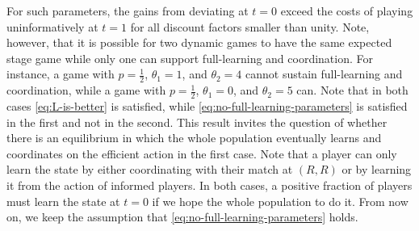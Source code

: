 \documentclass[12pt,letterpaper]{article}
\begin{document}
For such parameters, the gains from deviating at $t=0$ exceed the costs of playing uninformatively at $t=1$ for all discount factors smaller than unity. Note, however, that it is possible for two dynamic games to have the same expected stage game while only one can support full-learning and coordination. For instance, a game with $p=\frac{1}{2}$, $\theta_1=1$, and $\theta_2=4$ cannot sustain full-learning and coordination, while a game with $p=\frac{1}{2}$, $\theta_1=0$, and $\theta_2=5$ can. Note that in both cases \eqref{eq:L-is-better} is satisfied, while \eqref{eq:no-full-learning-parameters} is satisfied in the first and not in the second. This result invites the question of whether there is an equilibrium in which the whole population eventually learns and coordinates on the efficient action in the first case. Note that a player can only learn the state by either coordinating with their match at $(R,R)$ or by learning it from the action of informed players. In both cases, a positive fraction of players must learn the state at $t=0$ if we hope the whole population to do it. From now on, we keep the assumption that \eqref{eq:no-full-learning-parameters} holds.
\end{document}
